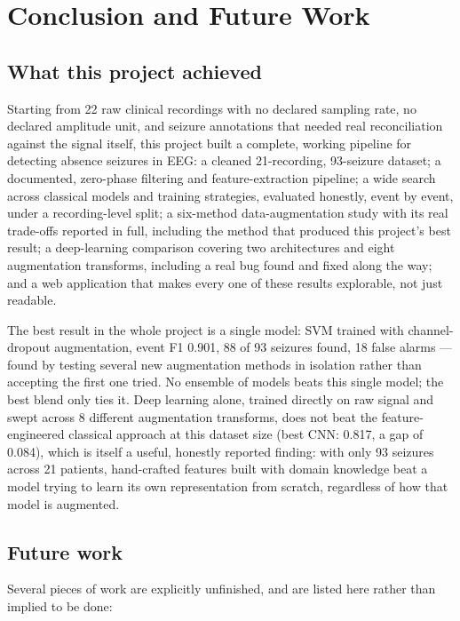 \chapter{Conclusion and Future Work}
\label{chap:conclusion}

\section{What this project achieved}

Starting from 22 raw clinical recordings with no declared sampling rate, no declared amplitude
unit, and seizure annotations that needed real reconciliation against the signal itself, this
project built a complete, working pipeline for detecting absence seizures in EEG: a cleaned
21-recording, 93-seizure dataset; a documented, zero-phase filtering and feature-extraction
pipeline; a wide search across classical models and training strategies, evaluated honestly,
event by event, under a recording-level split; a six-method data-augmentation study with its
real trade-offs reported in full, including the method that produced this project's best result;
a deep-learning comparison covering two architectures and eight augmentation transforms,
including a real bug found and fixed along the way; and a web application that makes every one
of these results explorable, not just readable.

The best result in the whole project is a single model: SVM trained with channel-dropout
augmentation, event F1 0.901, 88 of 93 seizures found, 18 false alarms --- found by testing
several new augmentation methods in isolation rather than accepting the first one tried. No
ensemble of models beats this single model; the best blend only ties it. Deep learning alone,
trained directly on raw signal and swept across 8 different augmentation transforms, does not
beat the feature-engineered classical approach at this dataset size (best CNN: 0.817, a gap of
0.084), which is itself a useful, honestly reported finding: with only 93 seizures across 21
patients, hand-crafted features built with domain knowledge beat a model trying to learn its own
representation from scratch, regardless of how that model is augmented.

\section{Future work}

Several pieces of work are explicitly unfinished, and are listed here rather than implied to be
done:

